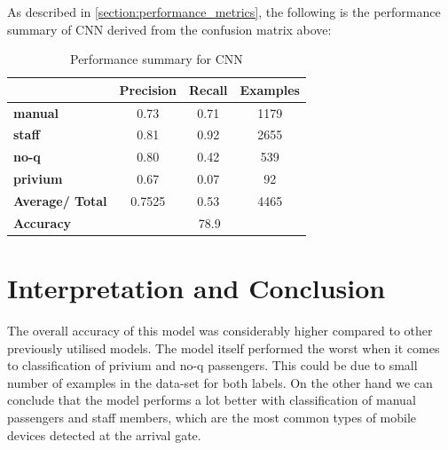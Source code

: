 \par
As described in \ref{section:performance_metrics}, the following is the performance summary of CNN derived from the confusion matrix above:

\begin{table}[H]
    \centering
    \begin{tabular}{|l|c|c|c|}
    \hline
                            & \textbf{Precision} & \textbf{Recall} & \textbf{Examples} \\ \hline
    \textbf{manual}         & 0.73               & 0.71            & 1179               \\ \hline
    \textbf{staff}          & 0.81               & 0.92            & 2655               \\ \hline
    \textbf{no-q}           & 0.80               & 0.42            & 539                \\ \hline
    \textbf{privium}        & 0.67               & 0.07            & 92                 \\ \hline
    \textbf{Average/ Total} & 0.7525             & 0.53           & 4465              \\ \hline
    \textbf{Accuracy}       & \multicolumn{3}{c|}{78.9}                                \\ \hline
    \end{tabular}
    \caption{Performance summary for CNN}
\end{table}

\pagebreak
\section{Interpretation and Conclusion}

\par
The overall accuracy of this model was considerably higher compared to other previously utilised models. The model itself performed the worst when it comes to classification of privium and no-q passengers. This could be due to small number of examples in the data-set for both labels. On the other hand we can conclude that the model performs a lot better with classification of manual passengers and staff members, which are the most common types of mobile devices detected at the arrival gate. 